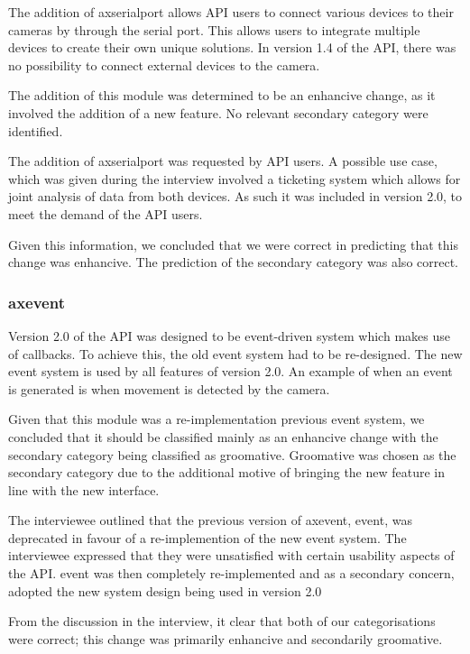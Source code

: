 \documentclass{sig-alternate}
\begin{document}
The addition of axserialport allows API users to connect various devices to their cameras by through the serial port. This allows users to integrate multiple devices to create their own unique solutions. In version 1.4 of the API, there was no possibility to connect external devices to the camera.

The addition of this module was determined to be an enhancive change, as it involved the addition of a new feature. No relevant secondary category were identified.

The addition of axserialport was requested by API users. A possible use case, which was given during the interview involved a ticketing system which allows for joint analysis of data from both devices. As such it was included in version 2.0, to meet the demand of the API users.

Given this information, we concluded that we were correct in predicting that this change was enhancive. The prediction of the secondary category was also correct. 

\subsubsection{axevent}

Version 2.0 of the API was designed to be event-driven system which makes use of callbacks. To achieve this, the old event system had to be re-designed. The new event system is used by all features of version 2.0. An example of when an event is generated is when movement is detected by the camera. 

Given that this module was a re-implementation previous event system, we concluded that it should be classified mainly as an enhancive change with the secondary category being classified as groomative. Groomative was chosen as the secondary category due to the additional motive of bringing the new feature in line with the new interface.

The interviewee outlined that the previous version of axevent, event, was deprecated in favour of a re-implemention of the new event system. The interviewee expressed that they were unsatisfied with certain usability aspects of the API. event was then completely re-implemented and as a secondary concern, adopted the new system design being used in version 2.0

From the discussion in the interview, it clear that both of our categorisations were correct; this change was primarily enhancive and secondarily groomative.
\end{document}
